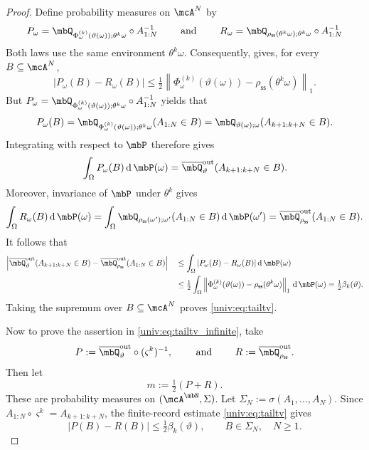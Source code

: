 \documentclass[a4paper]{article}
\numberwithin{equation}{section}   %
\theoremstyle{plain}   %
\theoremstyle{plain}   %
\theoremstyle{examplestyle}
\DeclareMathOperator{\pr}{\mbP}           %
\newcommand{\s}{\rho_{\mathsf{ss}}}     %
\newcommand{\dee}{\mathrm{d}}           %
\newcommand{\unorm}[1]{\left\lVert#1\right\rVert}
\begin{document}
\begin{proof}
    Define probability measures on $\mcA^N$ by
    \[
        P_\omega = \mbQ_{\Phi^{(k)}_\omega(\vartheta(\omega));\theta^k\omega}
            \circ A_{1:N}^{-1}
        \qquad\text{ and }\qquad 
        R_\omega =
        \mbQ_{\s(\theta^k\omega);\theta^k\omega}
            \circ A_{1:N}^{-1}
    \]
    Both laws use the same environment $\theta^k\omega$.
    Consequently,  gives, for every $B\subseteq\mcA^N$,
    \[
        |P_\omega(B)-R_\omega(B)|
        \le
        \tfrac12
        \unorm{
            \Phi^{(k)}_\omega(\vartheta(\omega))
            -\s(\theta^k\omega)
        }_1.
    \]
    But $P_\omega = \mbQ_{\Phi^{(k)}_\omega(\vartheta(\omega));\theta^k\omega}\circ A_{1:N}^{-1}$ yields that 
    \[
        P_\omega(B)
        =
        \mbQ_{\Phi^{(k)}_\omega(\vartheta(\omega));\theta^k\omega}
            (A_{1:N}\in B)
        =
        \mbQ_{\vartheta(\omega);\omega}
            (A_{k+1:k+N}\in B).
    \]
    Integrating with respect to $\pr$ therefore gives
    \[
        \int_\Omega P_\omega(B)\,\dee\pr(\omega)
        =
        \overline\mbQ^{\mathrm{out}}_\vartheta
            (A_{k+1:k+N}\in B).
    \]
    Moreover, invariance of $\pr$ under $\theta^k$ gives
    \begin{align*}
        \int_\Omega R_\omega(B)\,\dee\pr(\omega)
        =
        \int_\Omega
            \mbQ_{\s(\omega');\omega'}
                (A_{1:N}\in B)\,\dee\pr(\omega')
        =
        \overline\mbQ^{\mathrm{out}}_{\s}
            (A_{1:N}\in B).
    \end{align*}
    It follows that
    \begin{align*}
        \left|
            \overline\mbQ^{\mathrm{out}}_\vartheta
                (A_{k+1:k+N}\in B)
            -
            \overline\mbQ^{\mathrm{out}}_{\s}
                (A_{1:N}\in B)
        \right|
        &\quad\le
        \int_\Omega
            |P_\omega(B)-R_\omega(B)|\,\dee\pr(\omega)\\
        &\quad\le
        \tfrac12
        \int_\Omega
            \unorm{
                \Phi^{(k)}_\omega(\vartheta(\omega))
                -\s(\theta^k\omega)
            }_1\,\dee\pr(\omega)
        =\tfrac12\beta_k(\vartheta).
    \end{align*}
    Taking the supremum over $B\subseteq\mcA^N$ proves
    \eqref{univ:eq:tailtv}.
    
    Now to prove the assertion in \ref{univ:eq:tailtv_infinite}, take
    \[
        P:=
        \overline\mbQ^{\mathrm{out}}_\vartheta
            \circ(\varsigma^k)^{-1},
        \qquad
        \text{ and }
        \qquad
        R:=\overline\mbQ^{\mathrm{out}}_{\s}.
    \]
    Then let 
    \[
        m:=\tfrac12(P+R).
    \]
    These are probability measures on $(\mcA^\mbN,\Sigma)$.
    Let $\Sigma_N:=\sigma(A_1,\ldots,A_N)$.
    Since $A_{1:N}\circ\varsigma^k=A_{k+1:k+N}$, the finite-record estimate \eqref{univ:eq:tailtv} gives
    \[
        |P(B)-R(B)|
        \le\tfrac12\beta_k(\vartheta),
        \qquad B\in\Sigma_N,\quad N\ge1.
    \]


\end{proof}
\end{document}
